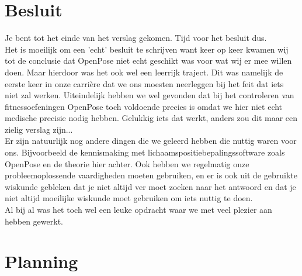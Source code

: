 \documentclass[a4paper,twoside,kulak]{kulakreport}
\begin{document}
\chapter*{Besluit}
Je bent tot het einde van het verslag gekomen. Tijd voor het besluit dus.\\
Het is moeilijk om een 'echt' besluit te schrijven want keer op keer kwamen wij tot de conclusie dat OpenPose niet echt geschikt was voor wat wij er mee willen doen. Maar hierdoor was het ook wel een leerrijk traject. Dit was namelijk de eerste keer in onze carrière dat we ons moesten neerleggen bij het feit dat iets niet zal werken. Uiteindelijk hebben we  wel gevonden dat bij het controleren van fitnessoefeningen OpenPose  toch voldoende precies is omdat we hier niet echt medische precisie nodig hebben. Gelukkig iets dat werkt, anders zou dit maar een zielig verslag zijn... \\
Er zijn natuurlijk nog andere dingen die we  geleerd hebben die nuttig waren voor ons. Bijvoorbeeld de kennismaking met lichaamspositiebepalingssoftware zoals OpenPose en de theorie hier achter. Ook hebben we regelmatig onze probleemoplossende vaardigheden moeten gebruiken, en er is ook uit de gebruikte wiskunde gebleken dat je niet altijd ver moet zoeken naar het antwoord en dat je niet altijd moeilijke wiskunde moet gebruiken om iets nuttig te doen.\\
Al bij al was het toch wel een leuke opdracht waar we met veel plezier aan hebben gewerkt.

\chapter{Planning}
\end{document}
